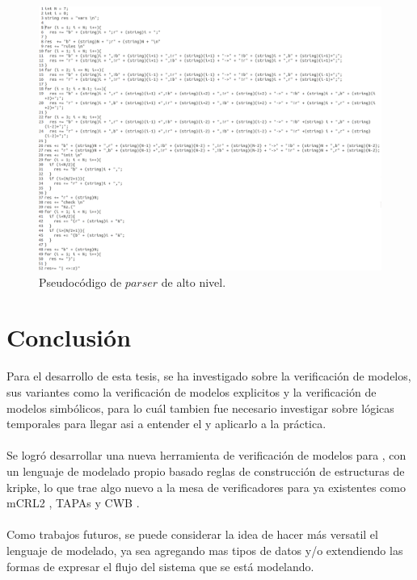 \begin{figure}[H]
  \centering
  \includegraphics[width=1.1\textwidth]{Figures/parser1.png}
  \caption{Pseudocódigo de $parser$ de alto nivel.}
  \label{fig:parser}
\end{figure}

\chapter*{Conclusión}

Para el desarrollo de esta tesis, se ha investigado sobre la verificación de modelos, sus variantes como la verificación de modelos explicitos y la verificación de modelos simbólicos, para lo cuál tambien fue necesario investigar sobre lógicas temporales para llegar asi a entender el {\mucalculo} y aplicarlo a la práctica.\\
\\
Se logró desarrollar una nueva herramienta de verificación de modelos para {\mucalculo}, con un lenguaje de modelado propio basado reglas de construcción de estructuras de kripke, lo que trae algo nuevo a la mesa de verificadores para {\mucalculo} ya existentes como mCRL2 \cite{Groote:14}, TAPAs \cite{Calzolai:15} y CWB \cite{Moller:13}.\\
\\
Como trabajos futuros, se puede considerar la idea de hacer más versatil el lenguaje de modelado, ya sea agregando mas tipos de datos y/o extendiendo las formas de expresar el flujo del sistema que se está modelando.